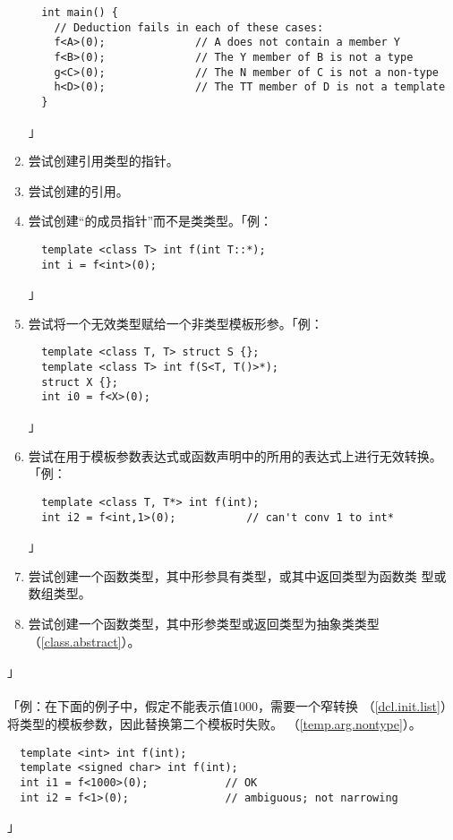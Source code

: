 \begin{enumerate}
{\begin{lstlisting}
  int main() {
    // Deduction fails in each of these cases:
    f<A>(0);              // A does not contain a member Y
    f<B>(0);              // The Y member of B is not a type
    g<C>(0);              // The N member of C is not a non-type
    h<D>(0);              // The TT member of D is not a template
  }
\end{lstlisting}」}
  \item{尝试创建引用类型的指针。}
  \item{尝试创建的引用。}
  \item{尝试创建``的成员指针''而不是类类型。「例：
\begin{lstlisting}
  template <class T> int f(int T::*);
  int i = f<int>(0);
\end{lstlisting}」}
  \item{尝试将一个无效类型赋给一个非类型模板形参。「例：
\begin{lstlisting}
  template <class T, T> struct S {};
  template <class T> int f(S<T, T()>*);
  struct X {};
  int i0 = f<X>(0);
\end{lstlisting}」}
  \item{尝试在用于模板参数表达式或函数声明中的所用的表达式上进行无效转换。「例：
\begin{lstlisting}
  template <class T, T*> int f(int);
  int i2 = f<int,1>(0);           // can't conv 1 to int*
\end{lstlisting}」}
  \item{尝试创建一个函数类型，其中形参具有类型，或其中返回类型为函数类
    型或数组类型。}
  \item{尝试创建一个函数类型，其中形参类型或返回类型为抽象类类型
    （\ref{class.abstract}）。}
\end{enumerate}」

\paragraph{}
「例：在下面的例子中，假定不能表示值1000，需要一个窄转换
（\ref{dcl.init.list}）将类型的模板参数，因此替换第二个模板时失败。
（\ref{temp.arg.nontype}）。
\begin{lstlisting}
  template <int> int f(int);
  template <signed char> int f(int);
  int i1 = f<1000>(0);            // OK
  int i2 = f<1>(0);               // ambiguous; not narrowing
\end{lstlisting}」

